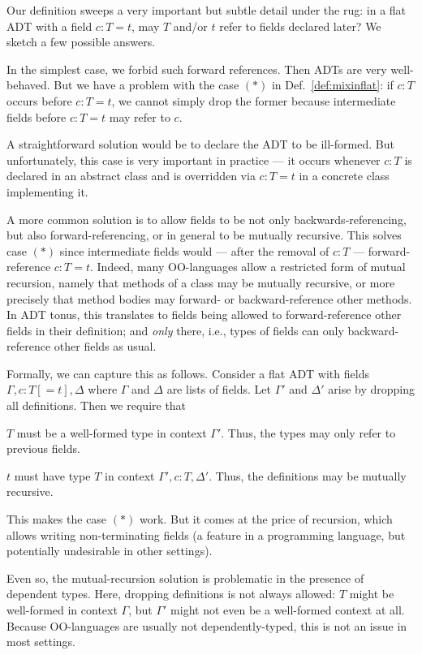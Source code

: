 \begin{remark}
Our definition sweeps a very important but subtle detail under the rug: in a flat ADT with a field $c:T=t$, may $T$ and/or $t$ refer to fields declared later?
We sketch a few possible answers.

In the simplest case, we forbid such forward references.
Then ADTs are very well-behaved.
But we have a problem with the case $(\ast)$ in Def.~\ref{def:mixinflat}: if $c:T$ occurs before $c:T=t$, we cannot simply drop the former because intermediate fields before $c:T=t$ may refer to $c$.

A straightforward solution would be to declare the ADT to be ill-formed.
But unfortunately, this case is very important in practice --- it occurs whenever $c:T$ is declared in an abstract class and is overridden via $c:T=t$ in a concrete class implementing it.

A more common solution is to allow fields to be not only backwards-referencing, but also forward-referencing, or in general to be mutually recursive.
This solves case $(\ast)$ since intermediate fields would --- after the removal of $c:T$ --- forward-reference $c:T = t$.
Indeed, many OO-languages allow a restricted form of mutual recursion, namely that methods of a class may be mutually recursive, or more precisely that method bodies may forward- or backward-reference other methods.
In ADT tonus, this translates to fields being allowed to forward-reference other fields in their definition; and \emph{only} there, i.e., types of fields can only backward-reference other fields as usual.

Formally, we can capture this as follows. Consider a flat ADT with fields $\Gamma, c:T[=t], \Delta$ where $\Gamma$ and $\Delta$ are lists of fields.
Let $\Gamma'$ and $\Delta'$ arise by dropping all definitions.
Then we require that
\begin{compactitem}
 \item $T$ must be a well-formed type in context $\Gamma'$.
 Thus, the types may only refer to previous fields.
 \item $t$ must have type $T$ in context $\Gamma',c:T,\Delta'$.
 Thus, the definitions may be mutually recursive.
\end{compactitem}
This makes the case $(\ast)$ work.
But it comes at the price of recursion, which allows writing non-terminating fields (a feature in a programming language, but potentially undesirable in other settings).

Even so, the mutual-recursion solution is problematic in the presence of dependent types.
Here, dropping definitions is not always allowed:
$T$ might be well-formed in context $\Gamma$, but $\Gamma'$ might not even be a well-formed context at all.
Because OO-languages are usually not dependently-typed, this is not an issue in most settings.
\end{remark}

